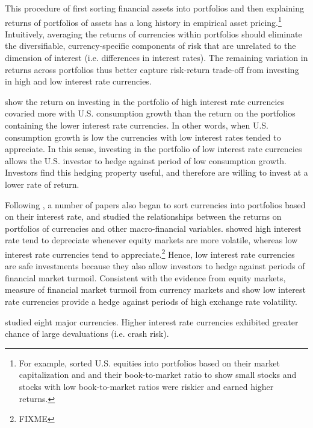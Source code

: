 \documentclass[12pt,letter]{article}
\theoremstyle{break} \theorembodyfont{\normalfont\itshape}
\theoremstyle{break}
\theoremstyle{break} \theorembodyfont{\normalfont\itshape}
\theoremstyle{break} \theorembodyfont{\normalfont\itshape}
\begin{document}
This procedure of first sorting financial assets into portfolios and
then explaining returns of portfolios of assets has a long history in
empirical asset pricing.\footnote{For example, \citet{FamaFrench1992}
  sorted U.S. equities into portfolios based on their market
  capitalization and and their book-to-market ratio to show small
  stocks and stocks with low book-to-market ratios were riskier and
  earned higher returns.} Intuitively, averaging the returns of
currencies within portfolios should eliminate the diversifiable,
currency-specific components of risk that are unrelated to the
dimension of interest (i.e. differences in interest rates). The
remaining variation in returns across portfolios thus better capture
risk-return trade-off from investing in high and low interest rate
currencies.

\citet{LustigVerdelhan2007} show the return on investing in the
portfolio of high interest rate currencies covaried more with U.S.
consumption growth than the return on the portfolios containing the
lower interest rate currencies. In other words, when U.S. consumption
growth is low the currencies with low interest rates tended to
appreciate. In this sense, investing in the portfolio of low interest
rate currencies allows the U.S. investor to hedge against period of
low consumption growth. Investors find this hedging property useful,
and therefore are willing to invest at a lower rate of return.

Following \citet{LustigVerdelhan2007}, a number of papers also began
to sort currencies into portfolios based on their interest rate, and
studied the relationships between the returns on portfolios of
currencies and other macro-financial variables.
\citet{LustigRoussanovVerdelhan2011} showed high interest rate tend to
depreciate whenever equity markets are more volatile, whereas low
interest rate currencies tend to
appreciate.\footnote{\citet{CampbellMeideirosViceira2010} FIXME}
Hence, low interest rate currencies are safe investments because they
also allow investors to hedge against periods of financial market
turmoil. Consistent with the evidence from equity markets,
\citet{MenkhoffSarnoSchmelingSchrimpf2012} measure of financial market
turmoil from currency markets and show low interest rate currencies
provide a hedge against periods of high exchange rate volatility.


\citet{BrunnermeierNagelPedersen2008} studied eight major currencies.
Higher interest rate currencies exhibited greater chance of large
devaluations (i.e. crash risk).
\end{document}

